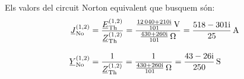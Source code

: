\begin{exemple}
    Els valors del circuit Norton equivalent que busquem són:
    \begin{align*}
       \cmplx{J}\ped{No}^{(1,2)} &= \frac{\cmplx{E}\ped{Th}^{(1,2)}}{\cmplx{Z}\ped{Th}^{(1,2)}} =
       \frac{\frac{\complexnum{12040+j210}}{101}\,\unit{V}}{\frac{\complexnum{430+j260}}{101}\,\unit{\ohm}} =
       \frac{\complexnum{518-j301}}{25}\,\unit{A} \\[2ex]
       \cmplx{Y}\ped{No}^{(1,2)} &= \frac{1}{\cmplx{Z}\ped{Th}^{(1,2)}} =
       \frac{1}{\frac{\complexnum{430+j260}}{101}\,\unit{\ohm}} = \frac{\complexnum{43-j26}}{250}\,\unit{S}
    \end{align*}

\end{exemple}
